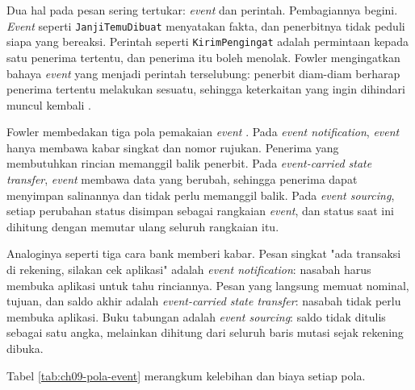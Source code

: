 Dua hal pada pesan sering tertukar: \textit{event} dan perintah. Pembagiannya begini.
\textit{Event} seperti \texttt{JanjiTemuDibuat} menyatakan fakta, dan penerbitnya tidak peduli siapa
yang bereaksi. Perintah seperti \texttt{KirimPengingat} adalah permintaan kepada satu penerima
tertentu, dan penerima itu boleh menolak. Fowler mengingatkan bahaya \textit{event} yang menjadi
perintah terselubung: penerbit diam-diam berharap penerima tertentu melakukan sesuatu, sehingga
keterkaitan yang ingin dihindari muncul kembali \cite{c09-fowler2017}.

Fowler membedakan tiga pola pemakaian \textit{event} \cite{c09-fowler2017}. Pada \textit{event
notification}, \textit{event} hanya membawa kabar singkat dan nomor rujukan. Penerima yang
membutuhkan rincian memanggil balik penerbit. Pada \textit{event-carried state transfer},
\textit{event} membawa data yang berubah, sehingga penerima dapat menyimpan salinannya dan tidak perlu
memanggil balik. Pada \textit{event sourcing}, setiap perubahan status disimpan sebagai rangkaian
\textit{event}, dan status saat ini dihitung dengan memutar ulang seluruh rangkaian itu.

Analoginya seperti tiga cara bank memberi kabar. Pesan singkat "ada transaksi di rekening, silakan
cek aplikasi" adalah \textit{event notification}: nasabah harus membuka aplikasi untuk tahu
rinciannya. Pesan yang langsung memuat nominal, tujuan, dan saldo akhir adalah \textit{event-carried
state transfer}: nasabah tidak perlu membuka aplikasi. Buku tabungan adalah \textit{event sourcing}:
saldo tidak ditulis sebagai satu angka, melainkan dihitung dari seluruh baris mutasi sejak rekening
dibuka.

Tabel \ref{tab:ch09-pola-event} merangkum kelebihan dan biaya setiap pola.

